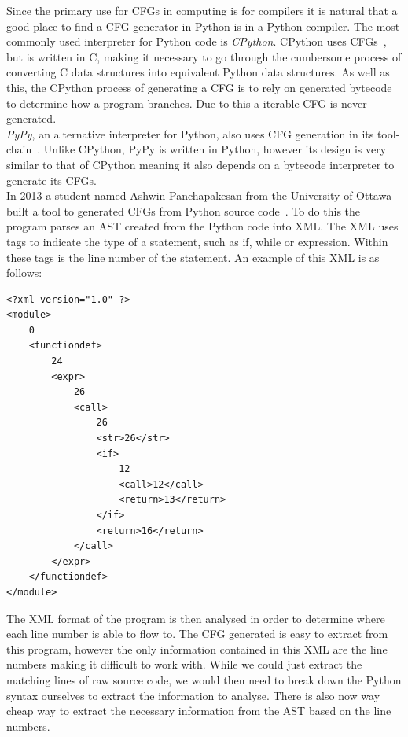 \documentclass[12pt, titlepage]{article}
\begin{document}
Since the primary use for CFGs in computing is for compilers it is natural that a good place to find a CFG generator in Python is in a Python compiler. The most commonly used interpreter for Python code is \textit{CPython}. CPython uses CFGs~\cite{cpythonCFG}, but is written in C, making it necessary to go through the cumbersome process of converting C data structures into equivalent Python data structures. As well as this, the CPython process of generating a CFG is to rely on generated bytecode to determine how a program branches. Due to this a iterable CFG is never generated. \\
\textit{PyPy}, an alternative interpreter for Python, also uses CFG generation in its tool-chain~\cite{pypyCFG}. Unlike CPython, PyPy is written in Python, however its design is very similar to that of CPython meaning it also depends on a bytecode interpreter to generate its CFGs. \\
In 2013 a student named Ashwin Panchapakesan from the University of Ottawa built a tool to generated CFGs from Python source code~\cite{ashwinCFG}. To do this the program parses an AST created from the Python code into XML. The XML uses tags to indicate the type of a statement, such as if, while or expression. Within these tags is the line number of the statement. An example of this XML is as follows:
\begin{verbatim}
<?xml version="1.0" ?>
<module>
    0
    <functiondef>
        24
        <expr>
            26
            <call>
                26
                <str>26</str>
                <if>
                    12
                    <call>12</call>
                    <return>13</return>
                </if>
                <return>16</return>
            </call>
        </expr>
    </functiondef>
</module>
\end{verbatim}
The XML format of the program is then analysed in order to determine where each line number is able to flow to. The CFG generated is easy to extract from this program, however the only information contained in this XML are the line numbers making it difficult to work with. While we could just extract the matching lines of raw source code, we would then need to break down the Python syntax ourselves to extract the information to analyse. There is also now way cheap way to extract the necessary information from the AST based on the line numbers.
\end{document}
